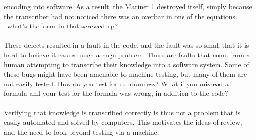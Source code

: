 encoding into software.
As a result, the Mariner 1 destroyed itself, simply because the transcriber had not noticed there
was an overbar in one of the equations.
\FIXME\ what's the formula that screwed up?\\
\\
These defects resulted in a fault in the code, and the fault was so small that it is hard to believe
it caused such a huge problem.
These are faults that come from a human attempting to transcribe their knowledge into a software
system.
Some of these bugs might have been amenable to machine testing, but many of them are not easily
tested.
How do you test for randomness?
What if you misread a formula and your test for the formula was wrong, in addition to the code?\\
\\
Verifying that knowledge is transcribed correctly is thus not a problem that is easily automated and
solved by computers.
This motivates the ideas of review, and the need to look beyond testing via a machine.

